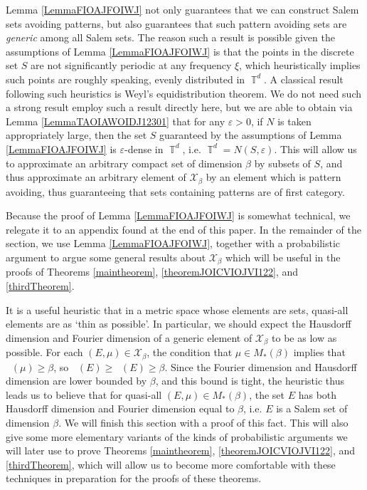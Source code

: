 \documentclass[dvipsnames,letterpaper,12pt]{article}
\numberwithin{equation}{section}
\DeclareMathOperator{\hausdim}{\dim_{\mathbb{H}}}
\DeclareMathOperator{\fordim}{\dim_{\mathbb{F}}}
\DeclareMathOperator{\TT}{\mathbb{T}}
\numberwithin{theorem}{section}
\begin{document}
Lemma \ref{LemmaFIOAJFOIWJ} not only guarantees that we can construct Salem sets avoiding patterns, but also guarantees that such pattern avoiding sets are \emph{generic} among all Salem sets. The reason such a result is possible given the assumptions of Lemma \ref{LemmaFIOAJFOIWJ} is that the points in the discrete set $S$ are not significantly periodic at any frequency $\xi$, which heuristically implies such points are roughly speaking, evenly distributed in $\TT^d$. A classical result following such heuristics is Weyl's equidistribution theorem. We do not need such a strong result employ such a result directly here, but we are able to obtain via Lemma \ref{LemmaTAOIAWOIDJ12301} that for any $\varepsilon > 0$, if $N$ is taken appropriately large, then the set $S$ guaranteed by the assumptions of Lemma \ref{LemmaFIOAJFOIWJ} is $\varepsilon$-dense in $\TT^d$, i.e. $\TT^d = N(S,\varepsilon)$. This will allow us to approximate an arbitrary compact set of dimension $\beta$ by subsets of $S$, and thus approximate an arbitrary element of $\mathcal{X}_\beta$ by an element which is pattern avoiding, thus guaranteeing that sets containing patterns are of first category.

Because the proof of Lemma \ref{LemmaFIOAJFOIWJ} is somewhat technical, we relegate it to an appendix found at the end of this paper. In the remainder of the section, we use Lemma \ref{LemmaFIOAJFOIWJ}, together with a probabilistic argument to argue some general results about $\mathcal{X}_\beta$ which will be useful in the proofs of Theorems \ref{maintheorem}, \ref{theoremJOICVIOJVI122}, and \ref{thirdTheorem}.

It is a useful heuristic that in a metric space whose elements are sets, quasi-all elements are as `thin as possible'. In particular, we should expect the Hausdorff dimension and Fourier dimension of a generic element of $\mathcal{X}_\beta$ to be as low as possible. For each $(E,\mu) \in \mathcal{X}_\beta$, the condition that $\mu \in M_*(\beta)$ implies that $\fordim(\mu) \geq \beta$, so $\hausdim(E) \geq \fordim(E) \geq \beta$. Since the Fourier dimension and Hausdorff dimension are lower bounded by $\beta$, and this bound is tight, the heuristic thus leads us to believe that for quasi-all $(E,\mu) \in M_*(\beta)$, the set $E$ has both Hausdorff dimension and Fourier dimension equal to $\beta$, i.e. $E$ is a Salem set of dimension $\beta$. We will finish this section with a proof of this fact. This will also give some more elementary variants of the kinds of probabilistic arguments we will later use to prove Theorems \ref{maintheorem}, \ref{theoremJOICVIOJVI122}, and \ref{thirdTheorem}, which will allow us to become more comfortable with these techniques in preparation for the proofs of these theorems.
\end{document}

